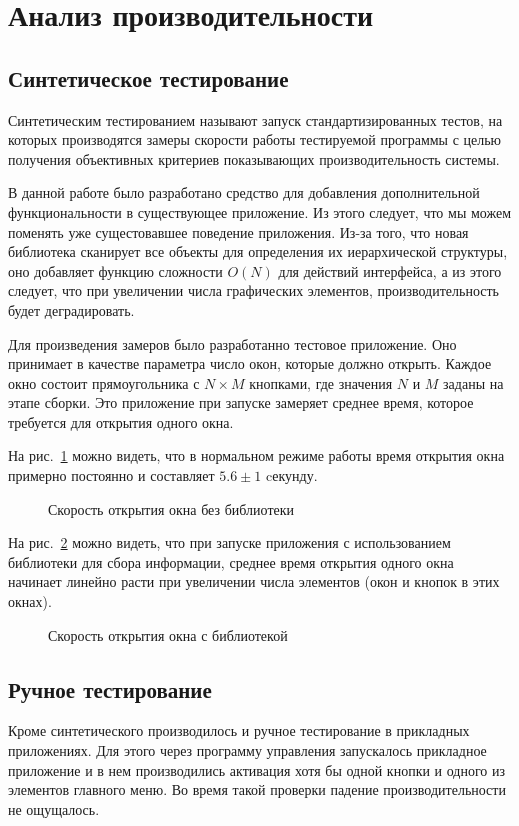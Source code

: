 \section{Анализ производительности}

\subsection{Синтетическое тестирование}

Синтетическим тестированием называют запуск стандартизированных тестов,
на которых производятся замеры скорости работы тестируемой программы с целью
получения объективных критериев показывающих производительность системы.

В данной работе было разработано средство для добавления дополнительной
функциональности в существующее приложение. Из этого следует, что мы можем
поменять уже сущестовавшее поведение приложения. Из-за того, что новая
библиотека сканирует все объекты для определения их иерархической структуры, оно
добавляет функцию сложности $O(N)$ для действий интерфейса, а из этого следует,
что при увеличении числа графических элементов, производительность будет
деградировать.

Для произведения замеров было разработанно тестовое приложение. Оно принимает в
качестве параметра число окон, которые должно открыть. Каждое окно состоит
прямоугольника с $N \times M$ кнопками, где значения $N$ и $M$ заданы на этапе
сборки. Это приложение при запуске замеряет среднее время, которое требуется
для открытия одного окна.

На рис.~\ref{normal-perf} можно видеть, что в нормальном режиме работы
время открытия окна примерно постоянно и составляет $5.6\pm1$ cекунду.

\begin{figure}[h]
	\centering
	
	\caption{Скорость открытия окна без библиотеки}\label{normal-perf}
\end{figure}

На рис.~\ref{lib-perf} можно видеть, что при запуске приложения с использованием
библиотеки для сбора информации, среднее время открытия одного окна начинает
линейно расти при увеличении числа элементов (окон и кнопок в этих окнах).

\begin{figure}[h]
	\centering
	
	\caption{Скорость открытия окна с библиотекой}\label{lib-perf}
\end{figure}

\subsection{Ручное тестирование}

Кроме синтетического производилось и ручное тестирование в прикладных
приложениях. Для этого через программу управления запускалось прикладное
приложение и в нем производились активация хотя бы одной кнопки и одного из
элементов главного меню. Во время такой проверки падение производительности не
ощущалось.
